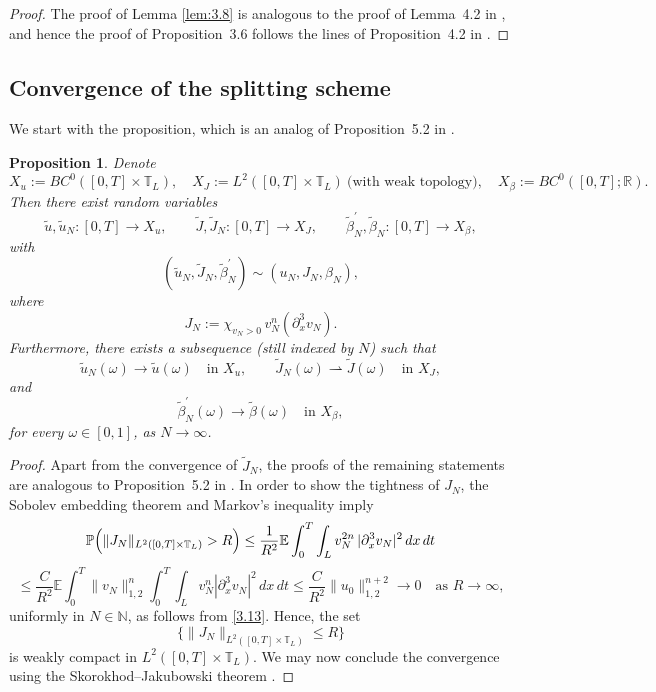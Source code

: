 \documentclass[a4paper,12pt]{article}
\newtheorem{proposition}[definition]{Proposition}
\numberwithin{equation}{section}
\def\T{\mathbb{T}_L}
\begin{document}
\begin{proof}
The proof of Lemma \ref{lem:3.8} is analogous to the proof of Lemma~4.2 in \cite{Gess1}, and hence the proof of Proposition~3.6 follows the lines of Proposition~4.2 in \cite{Gess1}.
\end{proof}

\subsection*{Convergence of the splitting scheme}

We start with the proposition, which is an analog of Proposition~5.2 in \cite{Gess1}.

\begin{proposition}\label{prop:3.7}
Denote
\[
X_u := BC^0([0,T]\times \T), \quad
X_J := L^2([0,T]\times \T)\ \text{(with weak topology)}, \quad
X_\beta := BC^0([0,T];\mathbb{R}).
\]
Then there exist random variables
\[
\tilde u, \tilde u_N : [0,T] \to X_u, \qquad
\tilde J, \tilde J_N : [0,T] \to X_J, \qquad
\tilde \beta_N^{'}, \tilde \beta_N : [0,T] \to X_\beta,
\]
with
\[
(\tilde u_N, \tilde J_N, \tilde \beta_N^{'}) \sim (u_N, J_N, \beta_N),
\]
where
\[
J_N := \chi_{v_N > 0}\, v_N^n(\partial_x^3 v_N).
\]
Furthermore, there exists a subsequence (still indexed by $N$) such that
\[
\tilde u_N(\omega) \to \tilde u(\omega) \quad \text{in } X_u, \qquad
\tilde J_N(\omega) \rightharpoonup \tilde J(\omega) \quad \text{in } X_J,
\]
and
\[
\tilde \beta_N^{'}(\omega) \to \tilde \beta(\omega) \quad \text{in } X_\beta,
\]
for every $\omega \in [0,1]$, as $N \to \infty$.
\end{proposition}

\begin{proof}
Apart from the convergence of $\tilde J_N$, the proofs of the remaining statements are analogous to Proposition~5.2 in \cite{Gess1}.  
In order to show the tightness of $J_N$, the Sobolev embedding theorem and Markov's inequality imply
\[
\mathbb{P}\Bigl( \|J_N\|_{L^2([0,T]\times \T)} > R \Bigr)
\le \frac{1}{R^2} \mathbb{E}\int_0^T \int_{L}
 v_N^{2n}\, |\partial_x^3 v_N|^2 \, dx\, dt
\]
\[
\le \frac{C}{R^2} \mathbb{E}\int_0^T \|v_N\|_{1,2}^n
\int_0^T \int_{L} v_N^n |\partial_x^3 v_N|^2 \, dx\, dt
\le \frac{C}{R^2} \|u_0\|_{1,2}^{n+2} \to 0
\quad \text{as } R \to \infty,
\]
uniformly in $N \in \mathbb{N}$, as follows from \eqref{3.13}.
Hence, the set
\[
\{ \|J_N\|_{L^2([0,T] \times \T)} \leq R \}
\]
is weakly compact in $L^2([0,T]\times \T)$.
We may now conclude the convergence using the Skorokhod--Jakubowski theorem \cite{Jakub}.
\end{proof}
\medskip
\end{document}
